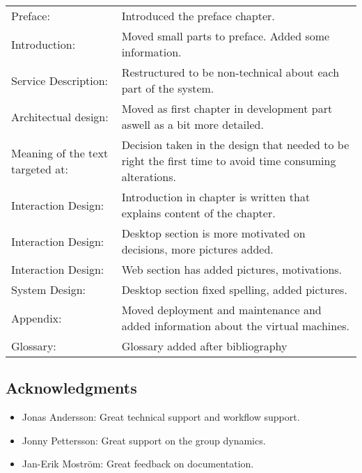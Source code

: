 \begin{tabularx}{\textwidth}{lX}
	Preface: & Introduced the preface chapter. \\
	Introduction: & Moved small parts to preface. Added some information. \\
	Service Description: & Restructured to be non-technical about each part of the system. \\
	Architectual design: & Moved as first chapter in development part aswell as a bit more detailed. \\
	Meaning of the text targeted at:  & Decision taken in the design that needed to be right the first time to avoid time consuming alterations. \\
	Interaction Design: & Introduction in chapter is written that explains content of the chapter. \\
	Interaction Design: & Desktop section is more motivated on decisions, more pictures added. \\
	Interaction Design: & Web section has added pictures, motivations. \\
	System Design: & Desktop section fixed spelling, added pictures. \\
	Appendix: & Moved deployment and maintenance and added information about the virtual machines.\\
	Glossary:  & Glossary added after bibliography \\
\end{tabularx}

\subsection*{Acknowledgments}
\begin{itemize}
	\item Jonas Andersson: Great technical support and workflow support.
	\item Jonny Pettersson: Great support on the group dynamics.
	\item Jan-Erik Moström: Great feedback on documentation.
\end{itemize}


